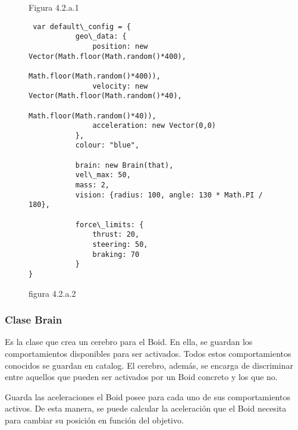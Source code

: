 \begin{figure}
Figura 4.2.a.1 
\begin{verbatim}
 var default\_config = {
           geo\_data: {
               position: new Vector(Math.floor(Math.random()*400), 
                                    Math.floor(Math.random()*400)),
               velocity: new Vector(Math.floor(Math.random()*40),
                                    Math.floor(Math.random()*40)),
               acceleration: new Vector(0,0)
           },
           colour: "blue",

           brain: new Brain(that),
           vel\_max: 50,
           mass: 2,
           vision: {radius: 100, angle: 130 * Math.PI / 180},

           force\_limits: {
               thrust: 20,
               steering: 50,
               braking: 70
           }
}
\end{verbatim}

figura 4.2.a.2
\end{figure}


\subsubsection{Clase Brain}
\label{subsubsection:brain}

Es la clase que crea un cerebro para el Boid. En ella, se guardan los comportamientos disponibles para ser activados. Todos estos 
comportamientos conocidos se guardan en catalog. El cerebro, además, se encarga de discriminar entre aquellos que pueden ser activados por 
un Boid concreto y los que no.

Guarda las aceleraciones el Boid posee para cada uno de sus comportamientos activos. De esta manera, se puede calcular la aceleración que 
el Boid necesita para cambiar su posición en función del objetivo.\\


